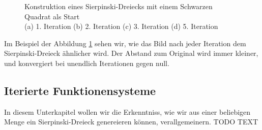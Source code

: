 \begin{figure}
	\label{ifs:sierpconst}
	\centering
	\caption{Konstruktion eines Sierpinski-Dreiecks mit einem Schwarzen Quadrat als Start\\
		(a) 1. Iteration (b) 2. Iteration (c) 3. Iteration (d) 5. Iteration}
\end{figure}
Im Beispiel der Abbildung \ref{ifs:sierpconst} sehen wir, wie das Bild nach jeder Iteration dem Sierpinski-Dreieck ähnlicher wird.
Der Abstand zum Original wird immer kleiner, und konvergiert bei unendlich Iterationen gegen null.

\subsection{Iterierte Funktionensysteme
\label{ifs:subsection:bonorum}}
In diesem Unterkapitel wollen wir die Erkenntniss, wie wir aus einer beliebigen Menge ein Sierpinski-Dreieck genereieren können, verallgemeinern.
TODO TEXT

